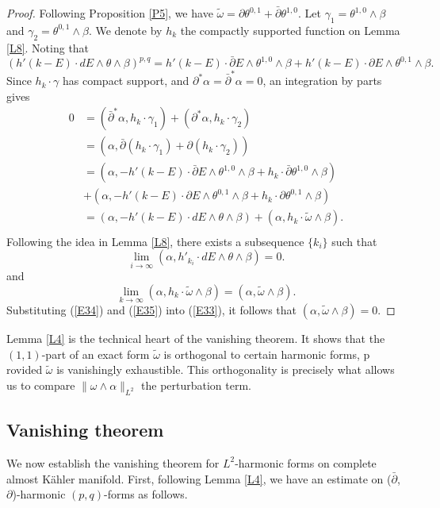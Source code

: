 \documentclass[12pt, twoside]{article}
\theoremstyle{definition}
\numberwithin{equation}{section}
\def \a {\alpha }
\def \b {\beta}
\def\w {\omega}
\def\pa{\partial}
\begin{document}
	\begin{proof}
		Following Proposition \ref{P5},	 we have $\tilde{\w}=\pa\theta^{0,1}+\bar{\pa}\theta^{1,0}$. Let $\gamma_{1}=\theta^{1,0}\wedge\b$ and $\gamma_{2}=\theta^{0,1}\wedge\b$. We denote by $h_{k}$ the compactly supported function on Lemma \ref{L8}. Noting  that 
		\begin{equation*}
		(h'(k-E)\cdot dE\wedge\theta\wedge\b)^{p,q}=h'(k-E)\cdot \bar{\pa}E\wedge\theta^{1,0}\wedge\b+h'(k-E)\cdot\pa E\wedge\theta^{0,1}\wedge\b.
		\end{equation*}
		Since $h_{k}\cdot\gamma$ has compact support, and $\pa^{\ast}\a=\bar{\pa}^{\ast}\a=0$, an integration by parts gives
		\begin{equation}\label{E33}
		\begin{split}
		0&=(\bar{\pa}^{\ast}\a,h_{k}\cdot\gamma_{1})+(\pa^{\ast}\a,h_{k}\cdot\gamma_{2})\\
		&=(\a,\bar{\pa}(h_{k}\cdot\gamma_{1})+\pa(h_{k}\cdot\gamma_{2}) )\\
		&=(\a,-h'(k-E)\cdot \bar{\pa}E\wedge\theta^{1,0}\wedge\b+h_{k}\cdot\bar{\pa}\theta^{1,0}\wedge\b)\\
		&+(\a,-h'(k-E)\cdot\pa E\wedge\theta^{0,1}\wedge\b+h_{k}\cdot\pa\theta^{0,1}\wedge\b)\\
		&=(\a,-h'(k-E)\cdot dE\wedge\theta\wedge\b)+(\a, h_{k}\cdot\tilde{\w}\wedge\b).\\
		\end{split}
		\end{equation}
		Following the idea in Lemma \ref{L8}, there exists a subsequence $\{k_{i}\}$ such that 
		\begin{equation}\label{E34}
		\lim_{i\rightarrow\infty}(\a,h'_{k_{i}}\cdot dE\wedge\theta\wedge\b )=0.
		\end{equation}
		and
		\begin{equation}\label{E35}
		\lim_{k\rightarrow\infty}(\a,h_{k}\cdot\tilde{\w}\wedge\b)=(\a,\tilde{\w}\wedge\b).
		\end{equation}
		Substituting (\ref{E34}) and (\ref{E35}) into (\ref{E33}), it follows that $(\a,\tilde{\w}\wedge\b)=0$. 
	\end{proof}
Lemma \ref{L4} is the technical heart of the vanishing theorem. 
It shows that the $(1,1)$-part of an exact form $\tilde{\w}$ is orthogonal to certain harmonic forms, p
rovided $\tilde{\w}$ is vanishingly exhaustible. This orthogonality is precisely what allows us to compare $\|\w\wedge\a\|_{L^2}$ the perturbation term.
	

\subsection{Vanishing theorem}
	We now establish the vanishing theorem for $L^{2}$-harmonic forms on complete almost K\"{a}hler manifold.  First, following Lemma \ref{L4}, we have an estimate on ($\bar{\pa}$, $\pa$)-harmonic $(p,q)$-forms as follows.
	
\end{document}
